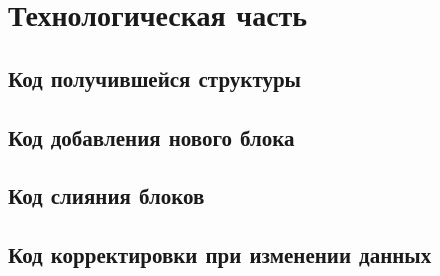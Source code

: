 \section{Технологическая часть}

\subsection{Код получившейся структуры}

\subsection{Код добавления нового блока}

\subsection{Код слияния блоков}

\subsection{Код корректировки при изменении данных}

\pagebreak
